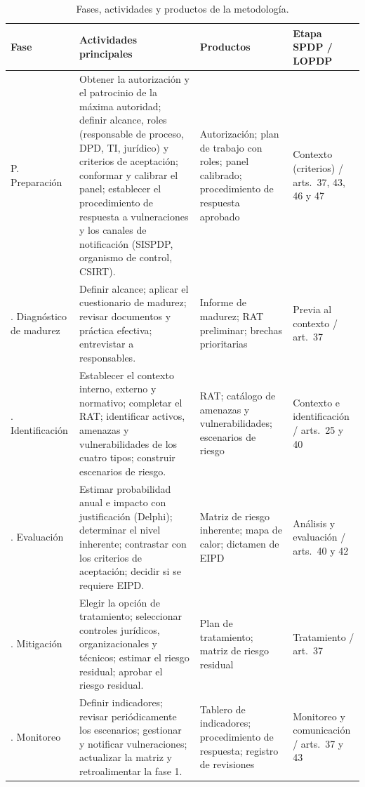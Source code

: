 \begin{table}[htbp]
  \centering
  \caption{Fases, actividades y productos de la metodología.}
  \label{tab:fases_detalle}
  \footnotesize
  \renewcommand{\arraystretch}{1.2}
  \begin{tabularx}{\textwidth}{|>{\raggedright\arraybackslash}p{1.9cm}|L|>{\raggedright\arraybackslash}p{3.0cm}|>{\raggedright\arraybackslash}p{2.3cm}|}
    \hline
    \textbf{Fase} & \textbf{Actividades principales} & \textbf{Productos} & \textbf{Etapa SPDP / LOPDP} \\
    \hline
    P. Preparación & Obtener la autorización y el patrocinio de la máxima autoridad; definir alcance, roles (responsable de proceso, DPD, TI, jurídico) y criterios de aceptación; conformar y calibrar el panel; establecer el procedimiento de respuesta a vulneraciones y los canales de notificación (SISPDP, organismo de control, CSIRT). & Autorización; plan de trabajo con roles; panel calibrado; procedimiento de respuesta aprobado & Contexto (criterios) / arts.~37, 43, 46 y 47 \\
    . Diagnóstico de madurez & Definir alcance; aplicar el cuestionario de madurez; revisar documentos y práctica efectiva; entrevistar a responsables. & Informe de madurez; RAT preliminar; brechas prioritarias & Previa al contexto / art.~37 \\
    . Identificación & Establecer el contexto interno, externo y normativo; completar el RAT; identificar activos, amenazas y vulnerabilidades de los cuatro tipos; construir escenarios de riesgo. & RAT; catálogo de amenazas y vulnerabilidades; escenarios de riesgo & Contexto e identificación / arts.~25 y 40 \\
    . Evaluación & Estimar probabilidad anual e impacto con justificación (Delphi); determinar el nivel inherente; contrastar con los criterios de aceptación; decidir si se requiere EIPD. & Matriz de riesgo inherente; mapa de calor; dictamen de EIPD & Análisis y evaluación / arts.~40 y 42 \\
    . Mitigación & Elegir la opción de tratamiento; seleccionar controles jurídicos, organizacionales y técnicos; estimar el riesgo residual; aprobar el riesgo residual. & Plan de tratamiento; matriz de riesgo residual & Tratamiento / art.~37 \\
    . Monitoreo & Definir indicadores; revisar periódicamente los escenarios; gestionar y notificar vulneraciones; actualizar la matriz y retroalimentar la fase 1. & Tablero de indicadores; procedimiento de respuesta; registro de revisiones & Monitoreo y comunicación / arts.~37 y 43 \\
    \hline
  \end{tabularx}
  \raggedright
\end{table}

